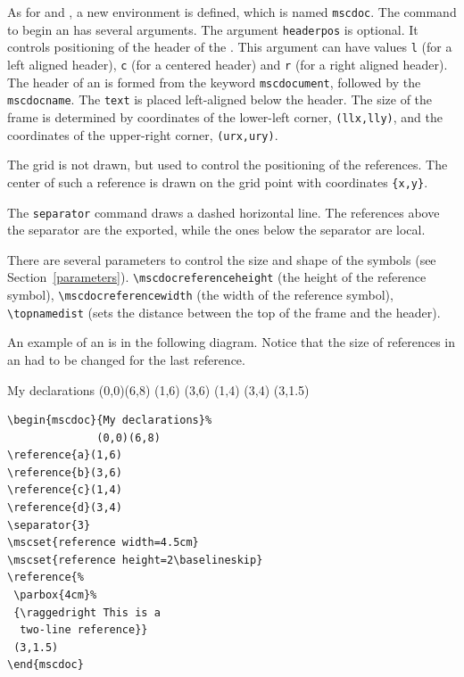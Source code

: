 \documentclass[12pt,a4paper]{article}
\begin{document}
As for \MSC{} and \HMSC{}, a new environment is defined, which is named
\verb+mscdoc+. The command to begin an \MSCdoc{} has several
arguments. The argument \verb+headerpos+ is optional. It controls
positioning of the header of the \MSCdoc{}.
This argument can have values
\verb+l+ (for a left aligned header), \verb+c+ (for a centered header)
and \verb+r+ (for a right aligned header).
The header of an \MSCdoc{} is formed from the keyword \verb+mscdocument+,
followed by the \verb+mscdocname+.
The \verb+text+ is placed left-aligned below the \MSCdoc{} header.
The size of the \MSCdoc{} frame is determined by
coordinates of the lower-left corner, \verb+(llx,lly)+, and the
coordinates of the upper-right corner, \verb+(urx,ury)+.

The \MSCdoc{} grid is not drawn, but used to control the positioning of the
\MSC{} references.
The center of such a reference is drawn on the grid point
with coordinates \verb+{x,y}+.

The \verb+separator+ command draws a dashed horizontal line. The \MSC{}
references above the separator are the exported, while the ones below
the separator are local.

There are several parameters to control the size and shape of the
symbols (see Section~\ref{parameters}).
\verb+\mscdocreferenceheight+ (the height of the reference symbol),
\verb+\mscdocreferencewidth+ (the width of the reference symbol),
\verb+\topnamedist+ (sets the distance between the top of the \MSCdoc{}
frame and the \MSCdoc{} header).

An example of an \MSCdoc{} is in the following diagram. Notice that
the size of references in an \MSCdoc{} had to be changed for the last
reference.

\medskip


\begin{minipage}{0.4\linewidth}
\begin{mscdoc}{My declarations}%
              (0,0)(6,8)
(1,6)
(3,6)
(1,4)
(3,4)
 (3,1.5)
\end{mscdoc}
\end{minipage}
%
\begin{minipage}{0.5\linewidth}
{\small
\begin{verbatim}
\begin{mscdoc}{My declarations}%
              (0,0)(6,8)
\reference{a}(1,6)
\reference{b}(3,6)
\reference{c}(1,4)
\reference{d}(3,4)
\separator{3}
\mscset{reference width=4.5cm}
\mscset{reference height=2\baselineskip}
\reference{%
 \parbox{4cm}%
 {\raggedright This is a
  two-line reference}}
 (3,1.5)
\end{mscdoc}
\end{verbatim}
}
\end{minipage}
\end{document}

